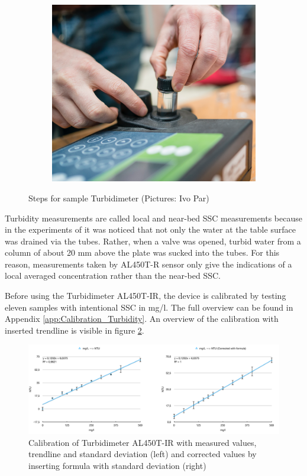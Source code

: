 \begin{figure}[ht!]
\begin{subfigure}{.202\textwidth}
  \includegraphics[width=.9\linewidth]{Images/Sample_5.png}
\end{subfigure}
\caption{Steps for sample Turbidimeter (Pictures: Ivo Par)}
\label{fig:NTU_steps}
\end{figure}



\noindent Turbidity measurements are called local and near-bed SSC measurements because in the experiments of \cite{Byishimo} it was noticed that not only the water at the table surface was drained via the tubes. Rather, when a valve was opened, turbid water from a column of about 20 mm above the plate was sucked into the tubes. For this reason, measurements taken by AL450T-R sensor only give the indications of a local averaged concentration rather than the near-bed SSC. \newline

\noindent Before using the Turbidimeter AL450T-IR, the device is calibrated by testing eleven samples with intentional SSC in mg/l. The full overview can be found in Appendix \ref{app:Calibration_Turbidity}. An overview of the calibration with inserted trendline is visible in figure \ref{fig:NTU_samples}.

\begin{figure}[ht!]
    \centering
    \includegraphics[width=1\linewidth]{Images/NTU_samples.png}
    \caption{Calibration of Turbidimeter AL450T-IR with measured values, trendline and standard deviation (left) and corrected values by inserting formula with standard deviation (right)}
    \label{fig:NTU_samples}
\end{figure}

